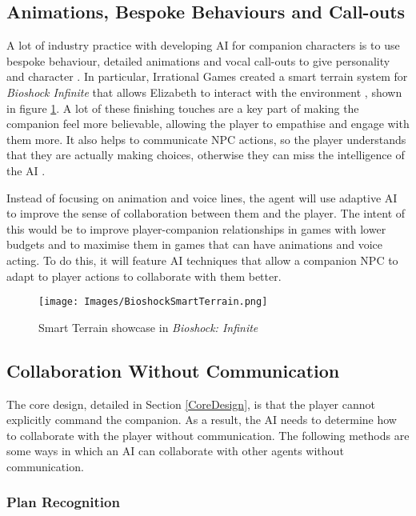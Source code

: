 \documentclass{IEEEtran}
\begin{document}
\subsection{Animations, Bespoke Behaviours and Call-outs}
\label{ABC}

A lot of industry practice with developing AI for companion characters is to use bespoke behaviour, detailed animations and vocal call-outs to give personality and character \cite{GAIP2EllieAI, GMTGoodAI, GAIPOReactions}. In particular, Irrational Games created a smart terrain system for \textit{Bioshock Infinite} that allows Elizabeth to interact with the environment \cite{GDCElizabeth, AIGamesBioshockAI}, shown in figure \ref{fig:BioshockSmartTerrain}. A lot of these finishing touches are a key part of making the companion feel more believable, allowing the player to empathise and engage with them more. It also helps to communicate NPC actions, so the player understands that they are actually making choices, otherwise they can miss the intelligence of the AI \cite{GMTGoodAI}.

Instead of focusing on animation and voice lines, the agent will use adaptive AI to improve the sense of collaboration between them and the player. The intent of this would be to improve player-companion relationships in games with lower budgets and to maximise them in games that can have animations and voice acting. To do this, it will feature AI techniques that allow a companion NPC to adapt to player actions to collaborate with them better.

\begin{figure}
  \centering
  \texttt{[image: Images/BioshockSmartTerrain.png]}
  
\caption{Smart Terrain showcase in \textit{Bioshock: Infinite}}
\label{fig:BioshockSmartTerrain}
\end{figure}

\subsection{Collaboration Without Communication}
\label{Communication}

The core design, detailed in Section \ref{CoreDesign}, is that the player cannot explicitly command the companion. As a result, the AI needs to determine how to collaborate with the player without communication. The following methods are some ways in which an AI can collaborate with other agents without communication.

\subsubsection{Plan Recognition}
\label{PlanRecognition}
\end{document}
